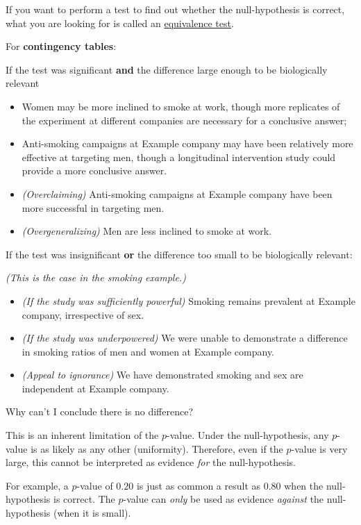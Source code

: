 \documentclass[
]{book}
\providecommand{\tightlist}{%
  \setlength{\itemsep}{0pt}\setlength{\parskip}{0pt}}
\begin{document}
If you want to perform a test to find out whether the null-hypothesis is correct, what you are looking for is called an \href{https://en.wikipedia.org/wiki/Equivalence_test}{equivalence test}.

For \textbf{contingency tables}:

If the test was significant \textbf{and} the difference large enough to be biologically relevant

\begin{itemize}
\tightlist
\item
  Women may be more inclined to smoke at work, though more replicates of the experiment at different companies are necessary for a conclusive answer;
\item
  Anti-smoking campaigns at Example company may have been relatively more effective at targeting men, though a longitudinal intervention study could provide a more conclusive answer.
\item
  \emph{(Overclaiming)} Anti-smoking campaigns at Example company have been more successful in targeting men.
\item
  \emph{(Overgeneralizing)} Men are less inclined to smoke at work.
\end{itemize}

If the test was insignificant \textbf{or} the difference too small to be biologically relevant:

\emph{(This is the case in the smoking example.)}

\begin{itemize}
\tightlist
\item
  \emph{(If the study was sufficiently powerful)} Smoking remains prevalent at Example company, irrespective of sex.
\item
  \emph{(If the study was underpowered)} We were unable to demonstrate a difference in smoking ratios of men and women at Example company.
\item
  \emph{(Appeal to ignorance)} We have demonstrated smoking and sex are independent at Example company.
\end{itemize}

Why can't I conclude there is no difference?

This is an inherent limitation of the \(p\)-value. Under the null-hypothesis, any \(p\)-value is as likely as any other (uniformity). Therefore, even if the \(p\)-value is very large, this cannot be interpreted as evidence \emph{for} the null-hypothesis.

For example, a \(p\)-value of \(0.20\) is just as common a result as \(0.80\) when the null-hypothesis is correct. The \(p\)-value can \emph{only} be used as evidence \emph{against} the null-hypothesis (when it is small).
\end{document}
